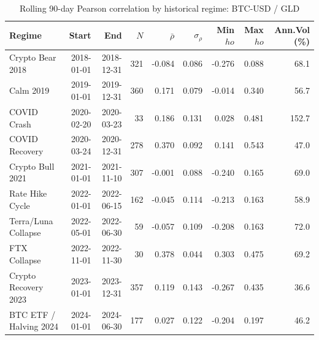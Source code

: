 \begin{table}[H]
\centering
\small
\caption{Rolling 90-day Pearson correlation by historical regime: BTC-USD / GLD}
\label{tab:regime_corr_BTCUSDGLD}
\begin{tabular}{lrrrrrrrr}
\toprule
Regime & Start & End & $N$ & $\bar{\rho}$ & $\sigma_\rho$ & Min $
ho$ & Max $
ho$ & Ann.Vol (\%) \\
\midrule
Crypto Bear 2018 & 2018-01-01 & 2018-12-31 & 321 & -0.084 & 0.086 & -0.276 & 0.088 & 68.1 \\
Calm 2019 & 2019-01-01 & 2019-12-31 & 360 & 0.171 & 0.079 & -0.014 & 0.340 & 56.7 \\
COVID Crash & 2020-02-20 & 2020-03-23 & 33 & 0.186 & 0.131 & 0.028 & 0.481 & 152.7 \\
COVID Recovery & 2020-03-24 & 2020-12-31 & 278 & 0.370 & 0.092 & 0.141 & 0.543 & 47.0 \\
Crypto Bull 2021 & 2021-01-01 & 2021-11-10 & 307 & -0.001 & 0.088 & -0.240 & 0.165 & 69.0 \\
Rate Hike Cycle & 2022-01-01 & 2022-06-15 & 162 & -0.045 & 0.114 & -0.213 & 0.163 & 58.9 \\
Terra/Luna Collapse & 2022-05-01 & 2022-06-30 & 59 & -0.057 & 0.109 & -0.208 & 0.163 & 72.0 \\
FTX Collapse & 2022-11-01 & 2022-11-30 & 30 & 0.378 & 0.044 & 0.303 & 0.475 & 69.2 \\
Crypto Recovery 2023 & 2023-01-01 & 2023-12-31 & 357 & 0.119 & 0.143 & -0.267 & 0.435 & 36.6 \\
BTC ETF / Halving 2024 & 2024-01-01 & 2024-06-30 & 177 & 0.027 & 0.122 & -0.204 & 0.197 & 46.2 \\
\bottomrule
\end{tabular}
\end{table}